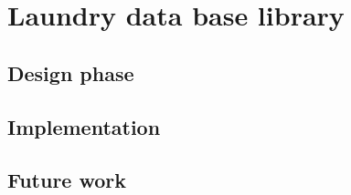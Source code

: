 %
\section{Laundry data base library}

\subsection{Design phase}

\subsection{Implementation}

\subsection{Future work}